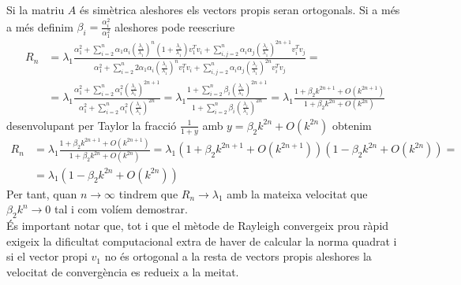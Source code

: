 \documentclass[a4paper,10pt]{article}
\renewcommand{\*}{\cdot}
\renewcommand{\(}{\left(}
\renewcommand{\)}{\right)}
\begin{document}
Si la matriu $A$ és simètrica aleshores els vectors propis seran ortogonals. Si a més a més definim $\beta_i=\frac{\alpha_i^2}{\alpha_1^2}$ aleshores pode reescriure
\begin{equation*}
 \begin{split}
  R_n&=\lambda_1\frac{\alpha_1^2+\sum_{i=2}^n\alpha_1\alpha_i\(\frac{\lambda_i}{\lambda_1}\)^n\(1+\frac{\lambda_i}{\lambda_1}\)v_1^Tv_i+
  \sum_{i,j=2}^n\alpha_i\alpha_j\(\frac{\lambda_i}{\lambda_1}\)^{2n+1}v_i^Tv_j}{\alpha_1^2+\sum_{i=2}^n2\alpha_1\alpha_i\(\frac{\lambda_i}{\lambda_1}\)^n
  v_1^Tv_i+\sum_{i,j=2}^n\alpha_i\alpha_j\(\frac{\lambda_i}{\lambda_1}\)^{2n}v_i^Tv_j}=\\
  &=\lambda_1\frac{\alpha_1^2+\sum_{i=2}^n\alpha_i^2\(\frac{\lambda_i}{\lambda_1}\)^{2n+1}}{\alpha_1^2+\sum_{i=2}^n\alpha_i^2\(\frac{\lambda_i}{\lambda_1}\)^{2n}}=
  \lambda_1\frac{1+\sum_{i=2}^n\beta_i\(\frac{\lambda_i}{\lambda_1}\)^{2n+1}}{1+\sum_{i=2}^n\beta_i\(\frac{\lambda_i}{\lambda_1}\)^{2n}}=
  \lambda_1\frac{1+\beta_2k^{2n+1}+O\(k^{2n+1}\)}{1+\beta_2k^{2n}+O\(k^{2n}\)}
 \end{split}
\end{equation*}
desenvolupant per Taylor la fracció $\frac{1}{1+y}$ amb $y=\beta_2k^{2n}+O\(k^{2n}\right)$ obtenim
\begin{equation*}
 \begin{split}
  R_n&=\lambda_1\frac{1+\beta_2k^{2n+1}+O\(k^{2n+1}\)}{1+\beta_2k^{2n}+O\(k^{2n}\)}=\lambda_1\(1+\beta_2k^{2n+1}+O\(k^{2n+1}\)\)\(1-\beta_2k^{2n}+O\(k^{2n}\)\)=\\
  &=\lambda_1\(1-\beta_2k^{2n}+O\(k^{2n}\)\)
 \end{split}
\end{equation*}
Per tant, quan $n\to\infty$ tindrem que $R_n\to\lambda_1$ amb la mateixa velocitat que $\beta_2k^n\to0$ tal i com volíem demostrar.\\
És important notar que, tot i que el mètode de Rayleigh convergeix prou ràpid exigeix la dificultat computacional extra de haver de calcular la norma quadrat i si el vector
propi $v_1$ no és ortogonal a la resta de vectors propis aleshores la velocitat de convergència es redueix a la meitat.
\end{document}
